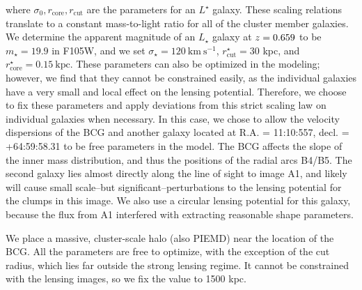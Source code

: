 \noindent where $\sigma_0,r_\mathrm{core},r_\mathrm{cut}$ are the parameters for an $L^\star$ galaxy. These scaling relations translate to a constant mass-to-light ratio for all of the cluster member galaxies. We determine the apparent magnitude of an $L_\star$ galaxy at $z=0.659$ to be $m_\star=19.9$ in F105W, and we set $\sigma_\star=120\ \mathrm{km\ s^{-1}}$, $r_\mathrm{cut}^\star=30$ kpc, and $r_\mathrm{core}^\star=0.15\ \mathrm{kpc}$. These parameters can also be optimized in the modeling; however, we find that they cannot be constrained easily, as the individual galaxies have a very small and local effect on the lensing potential. Therefore, we choose to fix these parameters and apply deviations from this strict scaling law on individual galaxies when necessary. In this case, we chose to allow the velocity dispersions of the BCG and another galaxy located at R.A. = 11:10:557, decl. = +64:59:58.31 to be free parameters in the model. The BCG affects the slope of the inner mass distribution, and thus the positions of the radial arcs B4/B5. The second galaxy lies almost directly along the line of sight to image A1, and likely will cause small scale--but significant--perturbations to the lensing potential for the clumps in this image. We also use a circular lensing potential for this galaxy, because the flux from A1 interfered with extracting reasonable shape parameters.

We place a massive, cluster-scale halo (also PIEMD) near the location of the BCG. All the parameters are free to optimize, with the exception of the cut radius, which lies far outside the strong lensing regime. It cannot be constrained with the lensing images, so we fix the value to 1500 kpc.

